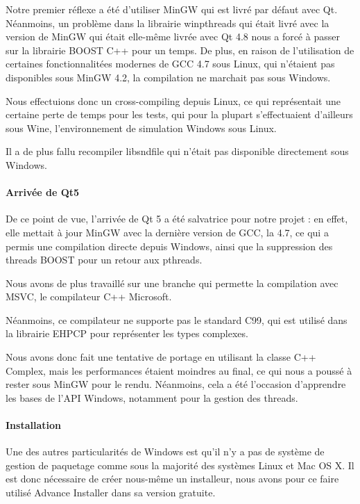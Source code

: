 Notre premier réflexe a été d'utiliser MinGW qui est livré par défaut avec Qt. Néanmoins, un problème
dans la librairie winpthreads qui était livré avec la version de MinGW qui était elle-même livrée avec Qt 4.8 nous a
forcé à passer sur la librairie BOOST C++ pour un temps. De plus, en raison de l'utilisation de certaines fonctionnalitées modernes
de \ac{GCC} 4.7 sous Linux, qui n'étaient pas disponibles sous MinGW 4.2, la compilation ne marchait pas sous Windows.

Nous effectuions donc un cross-compiling depuis Linux, ce qui représentait une certaine perte de temps pour les tests,
qui pour la plupart s'effectuaient d'ailleurs sous Wine, l'environnement de simulation Windows sous Linux.

Il a de plus fallu recompiler libsndfile qui n'était pas disponible directement sous Windows.

\paragraph{Arrivée de Qt5}
De ce point de vue, l'arrivée de Qt 5 a été salvatrice pour notre projet : en effet, elle mettait à jour MinGW
avec la dernière version de \ac{GCC}, la 4.7, ce qui a permis une compilation directe depuis Windows, ainsi que la suppression des
threads BOOST pour un retour aux pthreads.

Nous avons de plus travaillé sur une branche qui permette la compilation avec \ac{MSVC}, le compilateur C++ Microsoft.

Néanmoins, ce compilateur ne supporte pas le standard C99, qui est utilisé dans la librairie EHPCP pour représenter les types complexes.

Nous avons donc fait une tentative de portage en utilisant la classe C++ Complex, mais les performances étaient moindres au final,
ce qui nous a poussé à rester sous MinGW pour le rendu. Néanmoins, cela a été l'occasion d'apprendre les
bases de l'\ac{API} Windows, notamment pour la gestion des threads.

\paragraph{Installation}
Une des autres particularités de Windows est qu'il n'y a pas de système de gestion de paquetage comme sous la majorité des systèmes Linux et Mac OS X.
Il est donc nécessaire de créer nous-même un installeur, nous avons pour ce faire utilisé Advance Installer dans sa version gratuite.

